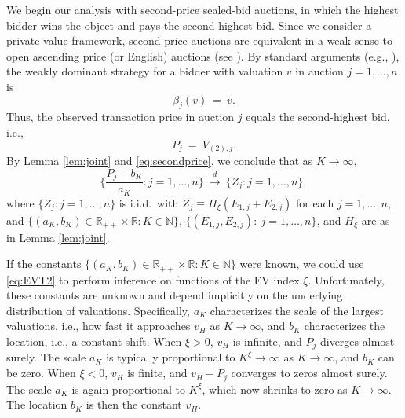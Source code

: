 We begin our analysis with second-price sealed-bid auctions, in which the highest bidder wins the object and pays the second-highest bid. Since we consider a private value framework, second-price auctions are equivalent in a weak sense to open ascending price (or English) auctions (see \citet[page 4]{krishna2009book}). By standard arguments (e.g., \citet[Proposition 2.1]{krishna2009book}), the weakly dominant strategy 
for a bidder with valuation $v$ in auction $j=1,\dots,n$ is
\begin{equation}
\beta_j(v)~=~v.  \label{eq:bidSecond}
\end{equation}
Thus, the observed transaction price in auction $j$ equals the second-highest bid, i.e., 
\begin{equation}
P_{j}~=~V_{( 2) ,j}.  \label{eq:secondprice}
\end{equation}
By Lemma \ref{lem:joint} and \eqref{eq:secondprice}, we conclude that as $ K\to \infty $, 
\begin{equation}
\Big\{ \frac{P_{j}-b_{K}}{a_{K}}:j=1,\dots,n\Big\} ~\overset{d}{ \to }~ \{ Z_{j}:j=1,\dots,n\} , 
\label{eq:EVT2}
\end{equation}
where $\{ Z_{j}:j=1,\dots,n\}$ is i.i.d.\ with $Z_{j}\equiv H_{\xi }(E_{1,j}+E_{2,j})$ for each $j=1,\dots,n$, and $ \{(a_{K},b_{K})\in \mathbb{R}_{++}\times \mathbb{R}:K\in \mathbb{N}\}$, $\{(E_{1,j},E_{2,j}):~j=1,\dots,n\}$, and $H_{\xi }$ are as in Lemma \ref{lem:joint}.

If the constants $\{(a_{K},b_{K})\in \mathbb{R}_{++}\times \mathbb{R}:K \in \mathbb{N}\}$ were known, we could use \eqref{eq:EVT2} to perform inference on functions of the EV index $\xi$. Unfortunately, these constants are unknown and depend implicitly on the underlying distribution of valuations. Specifically, $a_K$ characterizes the scale of the largest valuations, i.e., how fast it approaches $v_H$ as $K\to\infty$, and $b_K$ characterizes the location, i.e., a constant shift. When $\xi>0$, $v_H$ is infinite, and $P_j$ diverges almost surely. The scale $a_K$ is typically proportional to $K^{\xi}\to\infty$ as $K\to\infty$, and $b_K$ can be zero. When $\xi<0$, $v_H$ is finite, and $v_H - P_j$ converges to zeros almost surely. The scale $a_K$ is again proportional to $K^{\xi}$, which now shrinks to zero as $K\to\infty$. The location $b_K$ is then the constant $v_H$. 

